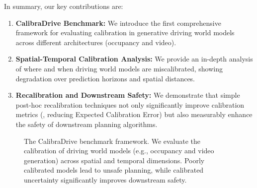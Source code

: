 In summary, our key contributions are:
\begin{enumerate}
    \item \textbf{CalibraDrive Benchmark:} We introduce the first comprehensive framework for evaluating calibration in generative driving world models across different architectures (occupancy and video).
    \item \textbf{Spatial-Temporal Calibration Analysis:} We provide an in-depth analysis of where and when driving world models are miscalibrated, showing degradation over prediction horizons and spatial distances.
    \item \textbf{Recalibration and Downstream Safety:} We demonstrate that simple post-hoc recalibration techniques not only significantly improve calibration metrics (\eg, reducing Expected Calibration Error) but also measurably enhance the safety of downstream planning algorithms.
\end{enumerate}

\begin{figure}[t]
    \centering
    \caption{The CalibraDrive benchmark framework. We evaluate the calibration of driving world models (e.g., occupancy and video generation) across spatial and temporal dimensions. Poorly calibrated models lead to unsafe planning, while calibrated uncertainty significantly improves downstream safety.}
    \label{fig:teaser}
\end{figure}
